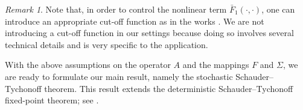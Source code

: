 \documentclass[english,a4paper,11pt]{amsart}
\theoremstyle{plain}
\theoremstyle{definition}
\theoremstyle{remark}
\newtheorem{remark}[theorem]{Remark}
\numberwithin{equation}{section}
\begin{document}
\begin{remark}\label{note cutoff}
	Note that, in order to control the nonlinear term $\bar F_1(\cdot,\cdot )$, one can introduce an appropriate cut-off function as in the works \cite{EHBJMPAR,EHJMT}. We are not introducing a cut-off function in our settings because doing so involves several technical details and is very specific to the application. 
\end{remark}



With the above assumptions on the operator \(A\) and the mappings \(F\) and \(\Sigma\), we are ready to formulate our main result, namely the stochastic Schauder--Tychonoff theorem. This result extends the deterministic Schauder--Tychonoff fixed-point theorem; see \cite[\S\S 6--7]{granas}.
	
	
	
\end{document}
